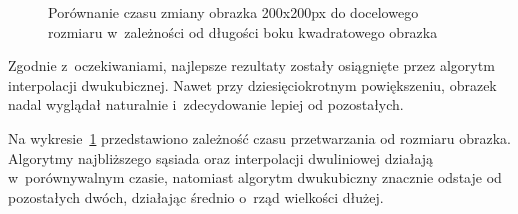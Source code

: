 \begin{figure}[h]
    \centering
    \caption{Porównanie czasu zmiany obrazka 200x200px do docelowego rozmiaru w~zależności od długości boku kwadratowego obrazka}
    \label{fig:resizing-time}
\end{figure}

Zgodnie z~oczekiwaniami, najlepsze rezultaty zostały osiągnięte przez algorytm interpolacji dwukubicznej. Nawet przy dziesięciokrotnym powiększeniu, obrazek nadal wyglądał naturalnie i~zdecydowanie lepiej od pozostałych.  

Na wykresie~\ref{fig:resizing-time} przedstawiono zależność czasu przetwarzania od rozmiaru obrazka. Algorytmy najbliższego sąsiada oraz interpolacji dwuliniowej działają w~porównywalnym czasie, natomiast algorytm dwukubiczny znacznie odstaje od pozostałych dwóch, działając średnio o~rząd wielkości dłużej.

